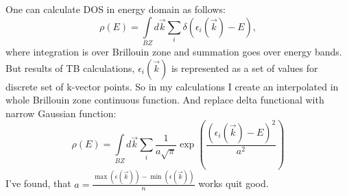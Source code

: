 One can calculate DOS in energy domain as follows: 
\begin{equation}
	\rho(E) = \int\limits_{BZ} d\vec{k} \sum\limits_i \delta(\epsilon_i(\vec{k}) - E),
\end{equation}
where integration is over Brillouin zone and summation goes over energy bands. But results of TB calculations, $\epsilon_i(\vec{k})$ is represented as a set of values for discrete set of k-vector points. So in my calculations I create an interpolated in whole Brillouin zone continuous function. And replace delta functional with narrow Gaussian function:
\begin{equation}
	\rho(E) = \int\limits_{BZ} d\vec{k} \sum\limits_i \frac{1}{a\sqrt{\pi}} \exp\left(\frac{(\epsilon_i(\vec{k}) - E)^2}{a^2}\right)
\end{equation}
I've found, that $a = \frac{\max(\epsilon(\vec{k})) - \min(\epsilon(\vec{k}))}{n}$ works quit good.

